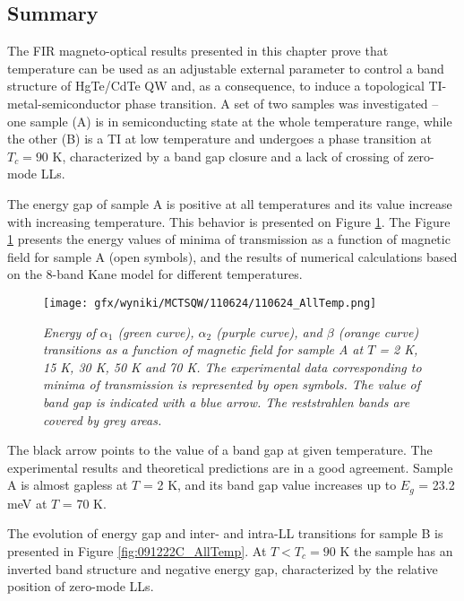 \documentclass[titlepage,a4paper]{book}
\newcommand{\wciecie}{\quad\phantom{v}}
\begin{document}
\clearpage
\subsection{Summary}
\wciecie
The FIR magneto-optical results presented in this chapter prove that temperature can be used as an adjustable external parameter to control a band structure of HgTe/CdTe QW and, as a consequence, to induce a topological TI-metal-semiconductor phase transition. A set of two samples was investigated -- one sample (A) is in semiconducting state at the whole temperature range, while the other (B) is a TI at low temperature and undergoes a phase transition at $T_c = 90$ K, characterized by a band gap closure and a lack of crossing of zero-mode LLs. 

The energy gap of sample A is positive at all temperatures and its value increase with increasing temperature. This behavior is presented on Figure \ref{fig:110624_AllTemp}. The Figure \ref{fig:110624_AllTemp} presents the energy values of minima of transmission as a function of magnetic field for sample A (open symbols), and the results of numerical calculations based on the 8-band Kane model for different temperatures.   
\begin{figure}[ht]
	\centering
	\texttt{[image: gfx/wyniki/MCTSQW/110624/110624\_AllTemp.png]}
	\vspace{-10pt}
	\caption{\textit{Energy of $\alpha_1$ (green curve), $\alpha_2$ (purple curve), and $\beta$ (orange curve) transitions as a function of magnetic field for sample A at $T$ = 2 K, 15 K, 30 K, 50 K and 70 K. The experimental data corresponding to minima of transmission is represented by open symbols. The value of band gap is indicated with a blue arrow. The reststrahlen bands are covered by grey areas.}}
	\label{fig:110624_AllTemp}
\end{figure}
The black arrow points to the value of a band gap at given temperature. The experimental results and theoretical predictions are in a good agreement. Sample A is almost gapless at $T$ = 2 K, and its band gap value increases up to $E_g$ = 23.2 meV at $T$ = 70 K.

The evolution of energy gap and inter- and intra-LL transitions for sample B is presented in Figure \ref{fig:091222C_AllTemp}. At $T < T_c = 90$ K the sample has an inverted band structure and negative energy gap, characterized by the relative position of zero-mode LLs. 
\end{document}
